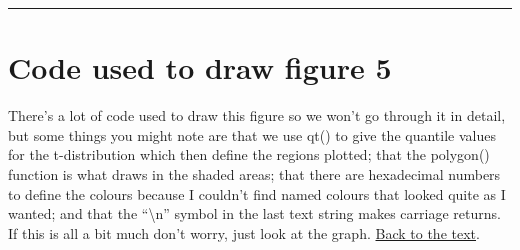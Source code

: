\documentclass[
]{book}
\begin{document}
\begin{center}\rule{0.5\linewidth}{0.5pt}\end{center}

\hypertarget{code-used-to-draw-figure-5}{%
\section{Code used to draw figure 5}\label{code-used-to-draw-figure-5}}

There's a lot of code used to draw this figure so we won't go through it in detail, but some things you might note are that we use qt() to give the quantile values for the t-distribution which then define the regions plotted; that the polygon() function is what draws in the shaded areas; that there are hexadecimal numbers to define the colours because I couldn't find named colours that looked quite as I wanted; and that the ``\textbackslash n'' symbol in the last text string makes carriage returns. If this is all a bit much don't worry, just look at the graph. \protect\hyperlink{return}{Back to the text}.
\end{document}
